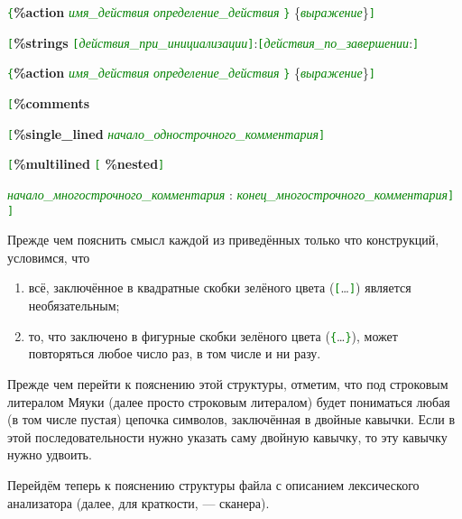 \documentclass[10pt]{report}
\begin{document}
\texttt{\textcolor{Green}{\{}}\textbf{\%action} \textcolor{Green}{\textit{имя_действия}} \textcolor{Green}{\textit{определение_действия}} \texttt{\textcolor{Green}{\}}}
\{\textcolor{Green}{\textit{выражение}}\}\texttt{\textcolor{Green}{]}}

\noindent%
\texttt{\textcolor{Green}{[}}\textbf{\%strings} \texttt{\textcolor{Green}{[}}\textcolor{Green}{\textit{действия_при_инициализации}}\texttt{\textcolor{Green}{]}}:\texttt{\textcolor{Green}{[}}\textcolor{Green}{\textit{действия_по_завершении}}:\texttt{\textcolor{Green}{]}} 

\texttt{\textcolor{Green}{\{}}\textbf{\%action} \textcolor{Green}{\textit{имя_действия}} \textcolor{Green}{\textit{определение_действия}} \texttt{\textcolor{Green}{\}}}
\{\textcolor{Green}{\textit{выражение}}\}\texttt{\textcolor{Green}{]}}

\noindent%
\texttt{\textcolor{Green}{[}}\textbf{\%comments}

\texttt{\textcolor{Green}{[}}\textbf{\%single_lined} \textcolor{Green}{\textit{начало_однострочного_комментария}}\texttt{\textcolor{Green}{]}}

\texttt{\textcolor{Green}{[}}\textbf{\%multilined} \texttt{\textcolor{Green}{[}}%
\textbf{\%nested}\texttt{\textcolor{Green}{]}}

\textcolor{Green}{\textit{начало_многострочного_комментария}} :
\textcolor{Green}{\textit{конец_многострочного_комментария}}\texttt{\textcolor{Green}{]}}%
\textcolor{Green}{\texttt{]}}

Прежде чем пояснить смысл каждой из приведённых только что конструкций, условимся, что
\begin{enumerate}
\item всё, заключённое в квадратные скобки зелёного цвета  (\texttt{\textcolor{Green}{[}}\dots\texttt{\textcolor{Green}{]}}) является необязательным;
\item то, что заключено в фигурные скобки зелёного цвета  (\texttt{\textcolor{Green}{\{}}\dots\texttt{\textcolor{Green}{\}}}), может повторяться любое число раз, в том числе и ни разу. 
\end{enumerate}

Прежде чем перейти к пояснению этой структуры, отметим, что под строковым литералом Мяуки (далее просто строковым литералом) будет пониматься любая (в том числе пустая) цепочка
символов, заключённая в двойные кавычки. Если в этой последовательности нужно указать саму двойную кавычку, то эту кавычку нужно удвоить.

Перейдём теперь к пояснению структуры файла с описанием лексического анализатора (далее, для краткости, --- сканера).
\end{document}
